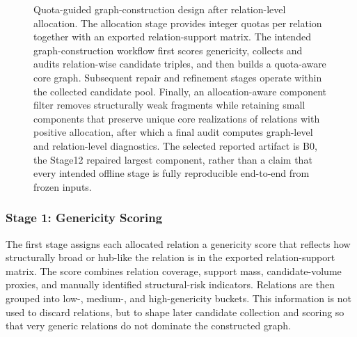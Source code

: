 \documentclass[12pt,a4paper]{article}
\begin{document}
\begin{figure}[!htbp]
\begin{tikzpicture}
\end{tikzpicture}
\caption[Phase II quota-guided graph-construction design]{Quota-guided graph-construction design after relation-level allocation. The allocation stage provides integer quotas per relation together with an exported relation-support matrix. The intended graph-construction workflow first scores genericity, collects and audits relation-wise candidate triples, and then builds a quota-aware core graph. Subsequent repair and refinement stages operate within the collected candidate pool. Finally, an allocation-aware component filter removes structurally weak fragments while retaining small components that preserve unique core realizations of relations with positive allocation, after which a final audit computes graph-level and relation-level diagnostics. The selected reported artifact is B0, the Stage12 repaired largest component, rather than a claim that every intended offline stage is fully reproducible end-to-end from frozen inputs.}
\label{fig:Phase2_pipeline}
\end{figure}

\subsubsection{Stage 1: Genericity Scoring}

The first stage assigns each allocated relation a genericity score that reflects how structurally broad or hub-like the relation is in the exported relation-support matrix. The score combines relation coverage, support mass, candidate-volume proxies, and manually identified structural-risk indicators. Relations are then grouped into low-, medium-, and high-genericity buckets. This information is not used to discard relations, but to shape later candidate collection and scoring so that very generic relations do not dominate the constructed graph.
\end{document}
